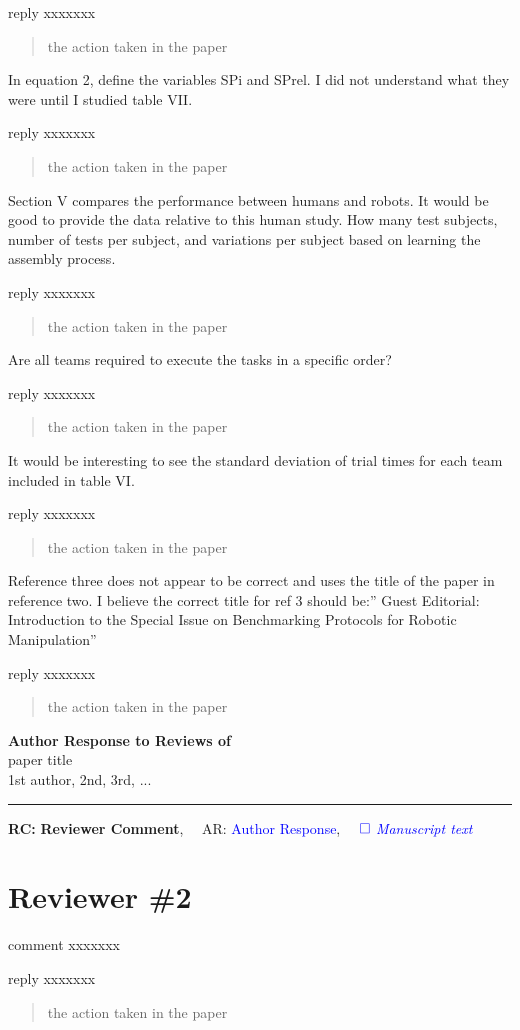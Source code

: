 \documentclass{article}
\def\papertitle{paper title}
\def\authors{1st author, 2nd, 3rd, ...}
\providecommand{\lettertitle}{Author Response to Reviews of}
\providecommand{\papertitle}{Title}
\providecommand{\authors}{Authors}
\providecommand{\journal}{Journal}
\providecommand{\doi}{--}
\def\headall{
{\Large\bf \lettertitle}\\[1em]
{\Large \papertitle}\\[1em]
{\authors}\\
\hrule

\hfill {\bfseries RC:} \textbf{{Reviewer Comment}},\(\quad\) AR: \textcolor{blue}{Author Response}, \(\quad\textcolor{blue}{\square}\) \emph{\textcolor{blue}{Manuscript text}}}
\begin{document}
\AR reply xxxxxxx
\begin{quote}
	the action taken in the paper
\end{quote}

\RC In equation 2, define the variables SPi and SPrel. I did not understand what they were until I studied table VII.

\AR reply xxxxxxx
\begin{quote}
	the action taken in the paper
\end{quote}

\RC Section V compares the performance between humans and robots.  It would be good to provide the data relative to this human study.  How many test subjects, number of tests per subject, and variations per subject based on learning the assembly process.

\AR reply xxxxxxx
\begin{quote}
	the action taken in the paper
\end{quote}

\RC Are all teams required to execute the tasks in a specific order?

\AR reply xxxxxxx
\begin{quote}
	the action taken in the paper
\end{quote}

\RC It would be interesting to see the standard deviation of trial times for each team included in table VI.

\AR reply xxxxxxx
\begin{quote}
	the action taken in the paper
\end{quote}

\RC Reference three does not appear to be correct and uses the title of the paper in reference two.  I believe the correct title for ref 3 should be:” Guest Editorial: Introduction to the Special Issue on Benchmarking Protocols for Robotic Manipulation”

\AR reply xxxxxxx
\begin{quote}
	the action taken in the paper
\end{quote}






\newpage
\headall
\section{Reviewer \#2}
\RC comment xxxxxxx

\AR reply xxxxxxx
\begin{quote}
	the action taken in the paper
\end{quote}
\end{document}

